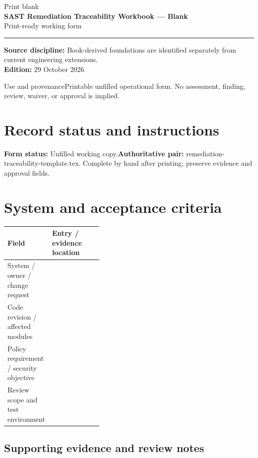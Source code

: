 \documentclass[10pt,letterpaper]{article}
\newcommand{\writearea}[1]{\par\begin{tcolorbox}[colback=white,colframe=linegray,boxrule=0.5pt,height=#1,sharp corners]\mbox{}\end{tcolorbox}\par}
\begin{document}
\hypersetup{pageanchor=false}%
\begin{titlepage}
\vspace*{1.0in}
{\color{bluegray}\Large Print blank}\\[1.0em]
{\color{navy}\Huge\bfseries SAST Remediation Traceability Workbook --- Blank}\\[0.7em]
{\Large Print-ready working form}\\[2.0em]
\rule{\linewidth}{1.0pt}
\vfill
\textbf{Source discipline:} Book-derived foundations are identified separately from current engineering extensions.\\
\textbf{Edition:} 29 October 2026
\end{titlepage}\hypersetup{pageanchor=true}
\tableofcontents
\clearpage
\begin{focusbox}{Use and provenance}Printable unfilled operational form. No assessment, finding, review, waiver, or approval is implied.\end{focusbox}
\section{Record status and instructions}
\textbf{Form status:} Unfilled working copy.\quad\textbf{Authoritative pair:} remediation-traceability-template.tex. Complete by hand after printing; preserve evidence and approval fields.

\section{System and acceptance criteria}
\begin{tabularx}{\linewidth}{@{}p{0.38\linewidth}Y@{}}
\toprule Field & Entry / evidence location\\\midrule
System / owner / change request & \\[1.0em]
\midrule
Code revision / affected modules & \\[1.0em]
\midrule
Policy requirement / security objective & \\[1.0em]
\midrule
Review scope and test environment & \\[1.0em]
\midrule
\end{tabularx}
\subsection{Supporting evidence and review notes}
\writearea{1.45in}
\clearpage
\end{document}
